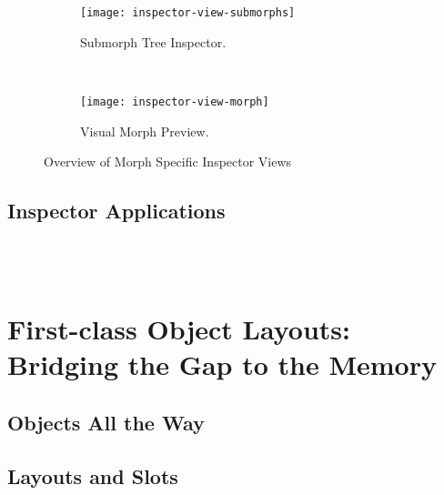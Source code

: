 \begin{figure}[h]
	\centering
	\begin{subfigure}[b]{\textwidth}
		\centering
		\texttt{[image: inspector-view-submorphs]}
		\caption{Submorph Tree Inspector.}
	\end{subfigure}\\
	\vspace{\baselineskip}
	\begin{subfigure}[b]{\textwidth}
		\centering
		\texttt{[image: inspector-view-morph]}
		\caption{Visual Morph Preview.}
	\end{subfigure}
	
	\caption{Overview of Morph Specific Inspector Views}
\end{figure}

\subsection{Inspector Applications}
 \\
 \\

\section{First-class Object Layouts: Bridging the Gap to the Memory}

\subsection{Objects All the Way}


\subsection{Layouts and Slots}

